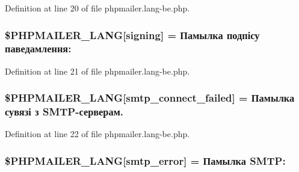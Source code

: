 Definition at line 20 of file phpmailer.\+lang-\/be.\+php.

\subsubsection[{\texorpdfstring{\$\+P\+H\+P\+M\+A\+I\+L\+E\+R\+\_\+\+L\+A\+NG}{$PHPMAILER_LANG}}]{\setlength{\rightskip}{0pt plus 5cm}\$P\+H\+P\+M\+A\+I\+L\+E\+R\+\_\+\+L\+A\+NG\mbox{[}\textquotesingle{}signing\textquotesingle{}\mbox{]} = \textquotesingle{}Памылка подпісу паведамлення\+: \textquotesingle{}}\hypertarget{phpmailer_8lang-be_8php_a68e437bdb9b968a5a67320f03d231565}{}\label{phpmailer_8lang-be_8php_a68e437bdb9b968a5a67320f03d231565}


Definition at line 21 of file phpmailer.\+lang-\/be.\+php.

\subsubsection[{\texorpdfstring{\$\+P\+H\+P\+M\+A\+I\+L\+E\+R\+\_\+\+L\+A\+NG}{$PHPMAILER_LANG}}]{\setlength{\rightskip}{0pt plus 5cm}\$P\+H\+P\+M\+A\+I\+L\+E\+R\+\_\+\+L\+A\+NG\mbox{[}\textquotesingle{}smtp\+\_\+connect\+\_\+failed\textquotesingle{}\mbox{]} = \textquotesingle{}Памылка сувязі з {\bf S\+M\+TP}-\/серверам.\textquotesingle{}}\hypertarget{phpmailer_8lang-be_8php_a7b321d4ca1e9df702403ed4c61aa0980}{}\label{phpmailer_8lang-be_8php_a7b321d4ca1e9df702403ed4c61aa0980}


Definition at line 22 of file phpmailer.\+lang-\/be.\+php.

\subsubsection[{\texorpdfstring{\$\+P\+H\+P\+M\+A\+I\+L\+E\+R\+\_\+\+L\+A\+NG}{$PHPMAILER_LANG}}]{\setlength{\rightskip}{0pt plus 5cm}\$P\+H\+P\+M\+A\+I\+L\+E\+R\+\_\+\+L\+A\+NG\mbox{[}\textquotesingle{}smtp\+\_\+error\textquotesingle{}\mbox{]} = \textquotesingle{}Памылка S\+M\+T\+P\+: \textquotesingle{}}\hypertarget{phpmailer_8lang-be_8php_a7d9cffba1e669c845f8a4c891ee50064}{}\label{phpmailer_8lang-be_8php_a7d9cffba1e669c845f8a4c891ee50064}


